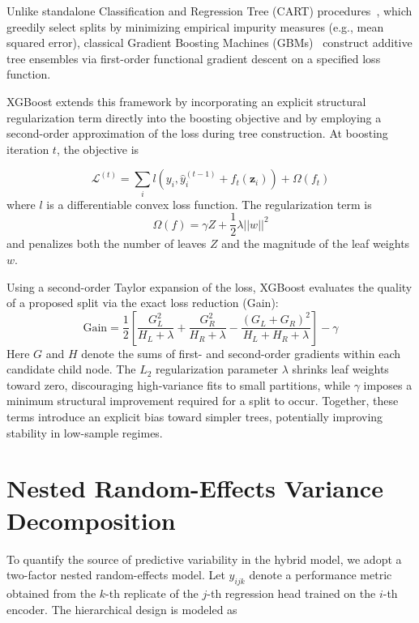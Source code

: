 Unlike standalone Classification and Regression Tree (CART) procedures~\cite{breiman2017classification}, which greedily select splits by minimizing empirical impurity measures (e.g., mean squared error), classical Gradient Boosting Machines (GBMs)~\cite{friedman2001greedy} construct additive tree ensembles via first-order functional gradient descent on a specified loss function. 

XGBoost extends this framework by incorporating an explicit structural regularization term directly into the boosting objective and by employing a second-order approximation of the loss during tree construction. At boosting iteration $t$, the objective is


\begin{equation}
    \mathcal{L}^{(t)} = \sum_i l(y_i, \hat{y}_i^{(t-1)} + f_t(\mathbf{z}_i)) + \Omega(f_t)
\end{equation}
where $l$ is a differentiable convex loss function. 
The regularization term is
\begin{equation}
    \Omega(f) = \gamma Z + \frac{1}{2}\lambda ||w||^2
\end{equation}
and penalizes both the number of leaves $Z$ and the magnitude of the leaf weights $w$.

Using a second-order Taylor expansion of the loss, XGBoost evaluates the quality of a proposed split via the exact loss reduction (Gain):
\begin{equation}
    \text{Gain} = \frac{1}{2} \left[ \frac{G_L^2}{H_L + \lambda} + \frac{G_R^2}{H_R + \lambda} - \frac{(G_L + G_R)^2}{H_L + H_R + \lambda} \right] - \gamma
\end{equation}
Here $G$ and $H$ denote the sums of first- and second-order gradients within each candidate child node. The $L_2$ regularization parameter $\lambda$ shrinks leaf weights toward zero, discouraging high-variance fits to small partitions, while $\gamma$ imposes a minimum structural improvement required for a split to occur. Together, these terms introduce an explicit bias toward simpler trees, potentially improving stability in low-sample regimes.

\section{Nested Random-Effects Variance Decomposition}
\label{sec:nested_anova}

To quantify the source of predictive variability in the hybrid model, we adopt a two-factor nested random-effects model. Let $y_{ijk}$ denote a performance metric obtained from the $k$-th replicate of the $j$-th regression head trained on the $i$-th encoder. The hierarchical design is modeled as

